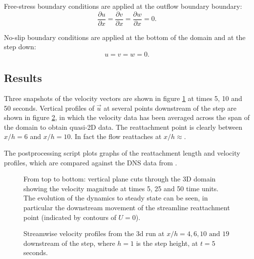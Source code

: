 Free-stress boundary conditions are applied at the outflow boundary boundary:
\begin{equation*}
\frac{\partial u}{\partial x} = \frac{\partial v}{\partial x} = \frac{\partial w}{\partial x} = 0.
\end{equation*}

No-slip boundary conditions are applied at the bottom of the domain and at the step down:
\begin{equation*}
u=v=w=0.
\end{equation*}

\subsection{Results}
Three snapshots of the velocity vectors are shown in figure \ref{Fig:velo-magnitude-3d}
at times 5, 10 and 50 seconds.
Vertical profiles of $\vec{u}$ at several points downstream of the step are shown in figure
\ref{Fig:UProfiles3d}, in which the velocity data has been averaged across the span of the domain
to obtain quasi-2D data. The reattachment point is clearly between $x/h=6$ and $x/h=10$.
In fact the flow reattaches at $x/h \approx $.

The postprocessing script plots graphs of the reattachment length
and velocity profiles, which are compared against the DNS data from \cite{le1997}.

\begin{figure}
\centering
{}
\caption{From top to bottom: vertical plane cuts through the 3D domain showing
the velocity magnitude at times 5, 25 and 50 time units.
The evolution of the dynamics to steady state can be seen, in particular the downstream movement
of the streamline reattachment point (indicated by contours of $U=0$).}
\label{Fig:velo-magnitude-3d}
\end{figure}

\begin{figure}
\centering
{}
\caption{Streamwise velocity profiles from the 3d run at $x/h=4, 6, 10 \text{ and } 19$
downstream of the step, where $h=1$ is the step height, at $t=5$ seconds.}
\label{Fig:UProfiles3d}
\end{figure}


